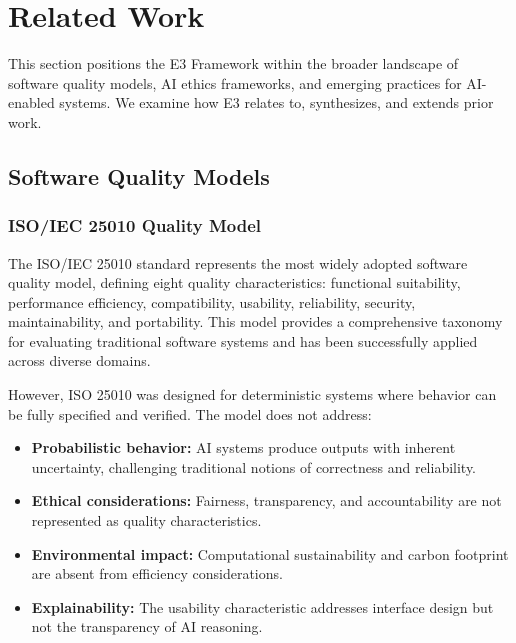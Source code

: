 
\section{Related Work}
\label{sec:related_work}

This section positions the E3 Framework within the broader landscape of software quality models, AI ethics frameworks, and emerging practices for AI-enabled systems. We examine how E3 relates to, synthesizes, and extends prior work.

\subsection{Software Quality Models}

\subsubsection{ISO/IEC 25010 Quality Model}

The ISO/IEC 25010 standard \cite{iso25010:2011} represents the most widely adopted software quality model, defining eight quality characteristics: functional suitability, performance efficiency, compatibility, usability, reliability, security, maintainability, and portability. This model provides a comprehensive taxonomy for evaluating traditional software systems and has been successfully applied across diverse domains.

However, ISO 25010 was designed for deterministic systems where behavior can be fully specified and verified. The model does not address:

\begin{itemize}[leftmargin=2em]
    \item \textbf{Probabilistic behavior:} AI systems produce outputs with inherent uncertainty, challenging traditional notions of correctness and reliability.
    \item \textbf{Ethical considerations:} Fairness, transparency, and accountability are not represented as quality characteristics.
    \item \textbf{Environmental impact:} Computational sustainability and carbon footprint are absent from efficiency considerations.
    \item \textbf{Explainability:} The usability characteristic addresses interface design but not the transparency of AI reasoning.
\end{itemize}

